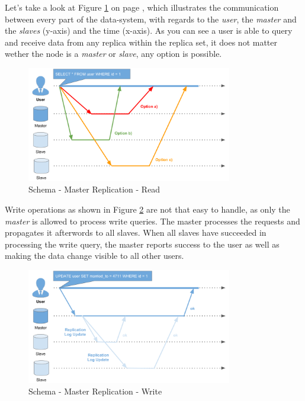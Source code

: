 {Let's take a look at Figure \ref{schema_replication_sl_read} on page \pageref{schema_replication_sl_read}, which illustrates the communication between every part of the data-system, with regards to the \textit{user}, the \textit{master} and the \textit{slaves} (y-axis) and the time (x-axis). As you can see a user is able to query and receive data from any replica within the replica set, it does not matter wether the node is a \textit{master} or \textit{slave}, any option is possible.

\begin{figure}[H]
	\centering
  \includegraphics[width=0.8\textwidth]{replication_schema_sl_read.png}
	\caption{Schema - Master Replication - Read}
	\label{schema_replication_sl_read}
\end{figure}

Write operations as shown in Figure \ref{schema_replication_sl_write} are not that easy to handle, as only the \textit{master} is allowed to process write queries. The master processes the requests and propagates it afterwords to all slaves. When all slaves have succeeded in processing the write query, the master reports success to the user as well as making the data change visible to all other users.

\begin{figure}[H]
	\centering
  \includegraphics[width=0.8\textwidth]{replication_schema_sl_write.png}
	\caption{Schema - Master Replication - Write}
	\label{schema_replication_sl_write}
\end{figure}
\newpage

}
